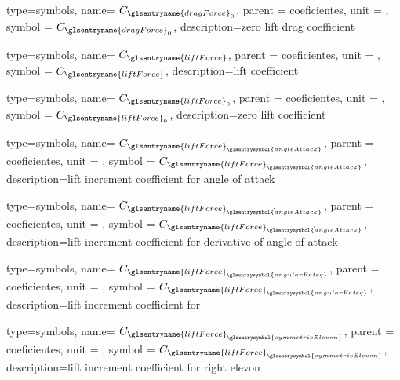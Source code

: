 {type=symbols,
    name= \ensuremath{C_{{\glsentryname{dragForce}}_{0}}},
    parent = {coeficientes},
    unit = \unexpanded{},
    symbol = \ensuremath{C_{{\glsentryname{dragForce}}_{0}}},
    description={zero lift drag coefficient}
}

{type=symbols,
    name= \ensuremath{C_{\glsentryname{liftForce}}},
    parent = {coeficientes},
    unit = \unexpanded{},
    symbol = \ensuremath{C_{\glsentryname{liftForce}}},
    description={lift coefficient}
}

{type=symbols,
    name= \ensuremath{C_{\glsentryname{liftForce}_{0}}},
    parent = {coeficientes},
    unit = \unexpanded{},
    symbol = \ensuremath{C_{\glsentryname{liftForce}_{0}}},
    description={zero lift coefficient}
}

{type=symbols,
    name= \ensuremath{C_{{\glsentryname{liftForce}}_{\glsentrysymbol{angleAttack}}}},
    parent = {coeficientes},
    unit = \unexpanded{},
    symbol = \ensuremath{C_{{\glsentryname{liftForce}}_{\glsentrysymbol{angleAttack}}}},
    description={lift increment coefficient for angle of attack}
}

{type=symbols,
    name= \ensuremath{C_{{\glsentryname{liftForce}}_{\dot{\glsentrysymbol{angleAttack}}}}},
    parent = {coeficientes},
    unit = \unexpanded{},
    symbol = \ensuremath{C_{{\glsentryname{liftForce}}_{\dot{\glsentrysymbol{angleAttack}}}}},
    description={lift increment coefficient for derivative of angle of attack}
}

{type=symbols,
    name= \ensuremath{C_{{\glsentryname{liftForce}}_{\glsentrysymbol{angularRateq}}}},
    parent = {coeficientes},
    unit = \unexpanded{},
    symbol = \ensuremath{C_{{\glsentryname{liftForce}}_{\glsentrysymbol{angularRateq}}}},
    description={lift increment coefficient for }
}

{type=symbols,
    name= \ensuremath{C_{{\glsentryname{liftForce}}_{\glsentrysymbol{symmetricElevon}}}},
    parent = {coeficientes},
    unit = \unexpanded{},
    symbol = \ensuremath{C_{{\glsentryname{liftForce}}_{\glsentrysymbol{symmetricElevon}}}},
    description={lift increment coefficient for right elevon}
}

